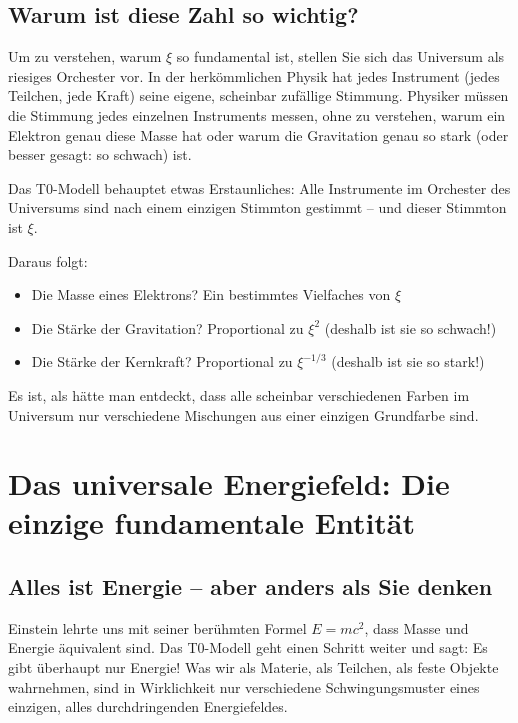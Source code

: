 \documentclass[12pt,a4paper]{article}
\newcommand{\xipar}{\ensuremath{\xi}}
\begin{document}
	\subsection{Warum ist diese Zahl so wichtig?}
	
	Um zu verstehen, warum $\xipar$ so fundamental ist, stellen Sie sich das Universum als riesiges Orchester vor. In der herkömmlichen Physik hat jedes Instrument (jedes Teilchen, jede Kraft) seine eigene, scheinbar zufällige Stimmung. Physiker müssen die Stimmung jedes einzelnen Instruments messen, ohne zu verstehen, warum ein Elektron genau diese Masse hat oder warum die Gravitation genau so stark (oder besser gesagt: so schwach) ist.
	
	\begin{important}
		Das T0-Modell behauptet etwas Erstaunliches: Alle Instrumente im Orchester des Universums sind nach einem einzigen Stimmton gestimmt -- und dieser Stimmton ist $\xipar$. 
		
		Daraus folgt:
		\begin{itemize}
			\item Die Masse eines Elektrons? Ein bestimmtes Vielfaches von $\xipar$
			\item Die Stärke der Gravitation? Proportional zu $\xipar^2$ (deshalb ist sie so schwach!)
			\item Die Stärke der Kernkraft? Proportional zu $\xipar^{-1/3}$ (deshalb ist sie so stark!)
		\end{itemize}
	\end{important}
	
	Es ist, als hätte man entdeckt, dass alle scheinbar verschiedenen Farben im Universum nur verschiedene Mischungen aus einer einzigen Grundfarbe sind.
	
	\section{Das universale Energiefeld: Die einzige fundamentale Entität}
	
	\subsection{Alles ist Energie -- aber anders als Sie denken}
	
	Einstein lehrte uns mit seiner berühmten Formel $E = mc^2$, dass Masse und Energie äquivalent sind. Das T0-Modell geht einen Schritt weiter und sagt: Es gibt überhaupt nur Energie! Was wir als Materie, als Teilchen, als feste Objekte wahrnehmen, sind in Wirklichkeit nur verschiedene Schwingungsmuster eines einzigen, alles durchdringenden Energiefeldes.
	
\end{document}
